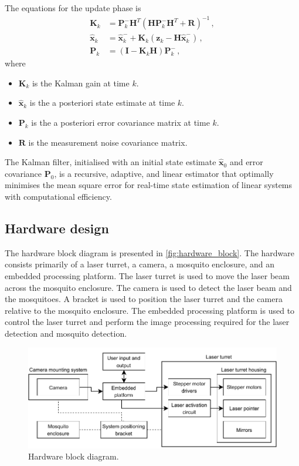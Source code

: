 The equations for the update phase is
\begin{equation}
  \begin{aligned}
    \mathbf{K}_k       & = \mathbf{P}_k^-\mathbf{H}^T(\mathbf{HP}_k^-\mathbf{H}^T + \mathbf{R})^{-1}\,,          \\
    \hat{\mathbf{x}}_k & = \hat{\mathbf{x}}_k^- + \mathbf{K}_k(\mathbf{z}_k - \mathbf{H}\hat{\mathbf{x}}_k^-)\,, \\
    \mathbf{P}_k       & = (\mathbf{I} - \mathbf{K}_k\mathbf{H})\mathbf{P}_k^-\,,
  \end{aligned}
  \label{eq:kalman_filter_update}
\end{equation}
where
\begin{itemize}
  \item $\mathbf{K}_k$ is the Kalman gain at time $k$.
  \item $\hat{\mathbf{x}}_k$ is the a posteriori state estimate at time $k$.
  \item $\mathbf{P}_k$ is the a posteriori error covariance matrix at time $k$.
  \item $\mathbf{R}$ is the measurement noise covariance matrix.
\end{itemize}

The Kalman filter, initialised with an initial state estimate $\hat{\mathbf{x}}_0$ and error covariance $\mathbf{P}_0$, is a recursive, adaptive, and linear estimator that optimally minimises the mean square error for real-time state estimation of linear systems with computational efficiency.

\FloatBarrier
\subsection{Hardware design}\label{subsec:hardware_design}
The hardware block diagram is presented in \autoref{fig:hardware_block}. The hardware consists primarily of a laser turret, a camera, a mosquito enclosure, and an embedded processing platform. The laser turret is used to move the laser beam across the mosquito enclosure. The camera is used to detect the laser beam and the mosquitoes. A bracket is used to position the laser turret and the camera relative to the mosquito enclosure. The embedded processing platform is used to control the laser turret and perform the image processing required for the laser detection and mosquito detection.
\begin{figure}[!htb]
  \centering
  \includegraphics[width=\textwidth]{figures/hardware_block_diagram.pdf}
  \caption{Hardware block diagram.}
  \label{fig:hardware_block}
\end{figure}



